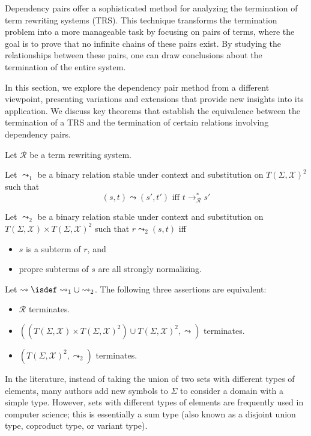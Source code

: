
Dependency pairs \cite{arts2000termination} offer a sophisticated method for analyzing the termination of term rewriting systems (TRS). This technique transforms the termination problem into a more manageable task by focusing on pairs of terms, where the goal is to prove that no infinite chains of these pairs exist. By studying the relationships between these pairs, one can draw conclusions about the termination of the entire system.

In this section, we explore the dependency pair method from a different viewpoint, presenting variations and extensions that provide new insights into its application. We discuss key theorems that establish the equivalence between the termination of a TRS and the termination of certain relations involving dependency pairs.

\begin{theorem}
Let $\mathcal{R}$ be a term rewriting system. 

Let $\leadsto_1$ be a binary relation stable under context and substitution on $T(\Sigma,\mathcal{X})^2$ such that $$(s,t) \leadsto (s',t') \text{ iff } t \to_\mathcal{R}^* s'$$

Let $\leadsto_2$ be a binary relation stable under context and substitution on $T(\Sigma,\mathcal{X}) \times T(\Sigma,\mathcal{X})^2$ such that $r \leadsto_2 (s,t)$ iff 
\begin{itemize}
    \item $s$ is a subterm of $r$, and
    \item propre subterms of $s$ are all strongly normalizing.
\end{itemize}

Let $\leadsto \isdef \leadsto_1 \cup \leadsto_2$.
The following three assertions are equivalent:
\begin{itemize}
    \item $\mathcal{R}$ terminates.
    \item $((T(\Sigma,\mathcal{X}) \times T(\Sigma,\mathcal{X})^2) \cup T(\Sigma,\mathcal{X})^2, \leadsto)$ terminates.
    \item $(T(\Sigma,\mathcal{X})^2, \leadsto_2)$ terminates.
\end{itemize} 
\end{theorem}

In the literature, instead of taking the union of two sets with different types of elements, many authors add new symbols to $\Sigma$ to consider a domain with a simple type. However, sets with different types of elements are frequently used in computer science; this is essentially a sum type (also known as a disjoint union type, coproduct type, or variant type).


